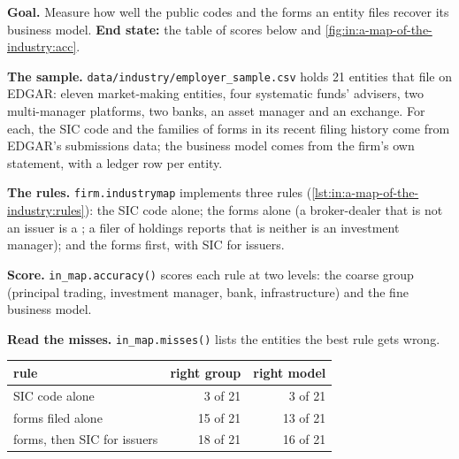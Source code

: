 \begin{tutorial}
\textbf{Goal.} Measure how well the public codes and the forms an entity files recover its business model. \textbf{End
state:} the table of scores below and \cref{fig:in:a-map-of-the-industry:acc}.
\begin{tutsteps}
\item \textbf{The sample.} \texttt{data/industry/employer\_sample.csv} holds 21 entities that file on EDGAR: eleven
market-making entities, four systematic funds' advisers, two multi-manager platforms, two banks, an asset manager and an
exchange. For each, the SIC code and the families of forms in its recent filing history come from EDGAR's submissions
data; the business model comes from the firm's own statement, with a ledger row per entity.
\item \textbf{The rules.} \texttt{firm.industrymap} implements three rules
(\cref{lst:in:a-map-of-the-industry:rules}): the SIC code alone; the forms alone (a broker-dealer that is not an issuer is
a ; a filer of holdings reports that is neither is an investment manager); and the forms first,
with SIC for issuers.
\label{lst:in:a-map-of-the-industry:rules}
\item \textbf{Score.} \texttt{in\_map.accuracy()} scores each rule at two levels: the coarse group (principal trading,
investment manager, bank, infrastructure) and the fine business model.
\item \textbf{Read the misses.} \texttt{in\_map.misses()} lists the entities the best rule gets wrong.
\end{tutsteps}
\end{tutorial}

\begin{center}\small
\begin{tabular}{@{}lrr@{}}
\toprule
rule & right group & right model\\
\midrule
SIC code alone & 3 of 21 & 3 of 21\\
forms filed alone & 15 of 21 & 13 of 21\\
forms, then SIC for issuers & 18 of 21 & 16 of 21\\
\bottomrule
\end{tabular}
\end{center}

